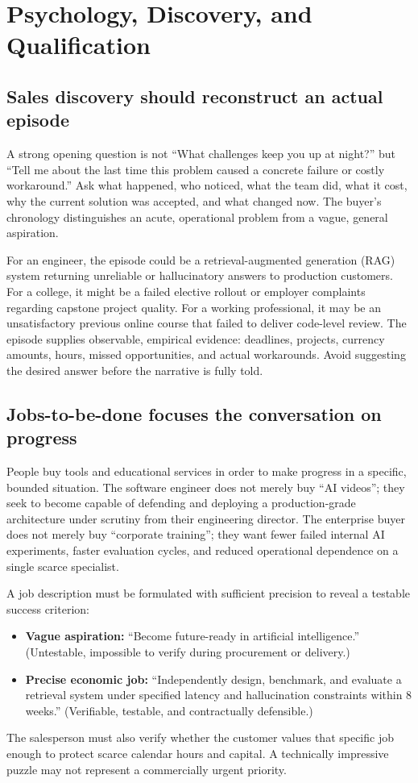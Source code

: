 \section{Psychology, Discovery, and Qualification}

\subsection{Sales discovery should reconstruct an actual episode}

A strong opening question is not ``What challenges keep you up at night?'' but ``Tell me about the last time this problem caused a concrete failure or costly workaround.'' Ask what happened, who noticed, what the team did, what it cost, why the current solution was accepted, and what changed now. The buyer's chronology distinguishes an acute, operational problem from a vague, general aspiration.

For an engineer, the episode could be a retrieval-augmented generation (RAG) system returning unreliable or hallucinatory answers to production customers. For a college, it might be a failed elective rollout or employer complaints regarding capstone project quality. For a working professional, it may be an unsatisfactory previous online course that failed to deliver code-level review. The episode supplies observable, empirical evidence: deadlines, projects, currency amounts, hours, missed opportunities, and actual workarounds. Avoid suggesting the desired answer before the narrative is fully told.

\subsection{Jobs-to-be-done focuses the conversation on progress}

People buy tools and educational services in order to make progress in a specific, bounded situation. The software engineer does not merely buy ``AI videos''; they seek to become capable of defending and deploying a production-grade architecture under scrutiny from their engineering director. The enterprise buyer does not merely buy ``corporate training''; they want fewer failed internal AI experiments, faster evaluation cycles, and reduced operational dependence on a single scarce specialist.

A job description must be formulated with sufficient precision to reveal a testable success criterion:
\begin{itemize}
\item \textbf{Vague aspiration:} ``Become future-ready in artificial intelligence.'' (Untestable, impossible to verify during procurement or delivery.)
\item \textbf{Precise economic job:} ``Independently design, benchmark, and evaluate a retrieval system under specified latency and hallucination constraints within 8 weeks.'' (Verifiable, testable, and contractually defensible.)
\end{itemize}
The salesperson must also verify whether the customer values that specific job enough to protect scarce calendar hours and capital. A technically impressive puzzle may not represent a commercially urgent priority.


